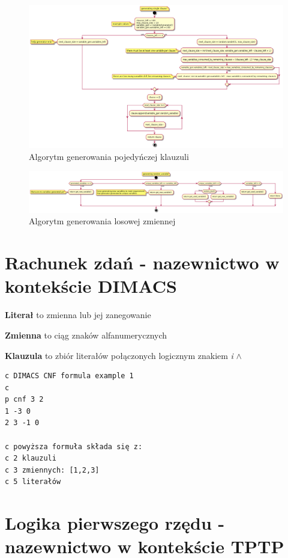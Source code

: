 \documentclass[a4paper,12pt]{article}
\begin{document}
\begin{figure}[H]
  \centering
  \includegraphics[width=\textwidth]{logic-formula-generator/clause_generator.png}
  \caption{Algorytm generowania pojedyńczej klauzuli}
\end{figure}

\begin{figure}[H]
  \centering
  \includegraphics[width=\textwidth]{logic-formula-generator/variable_generator.png}
  \caption{Algorytm generowania losowej zmiennej}
\end{figure}

\newpage

\section{Rachunek zdań - nazewnictwo w kontekście DIMACS}

\textbf{Literał}
to zmienna lub jej zanegowanie

\textbf{Zmienna}
to ciąg znaków alfanumerycznych

\textbf{Klauzula}
to zbiór literałów połączonych logicznym znakiem \textit{i} $\land$

\begin{verbatim}
c DIMACS CNF formula example 1
c
p cnf 3 2
1 -3 0
2 3 -1 0

c powyższa formuła składa się z:
c 2 klauzuli
c 3 zmiennych: [1,2,3]
c 5 literałów
\end{verbatim}

\section{Logika pierwszego rzędu - nazewnictwo w kontekście TPTP}
\end{document}
